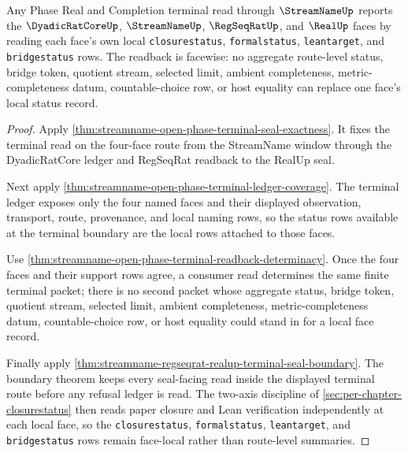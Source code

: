 \begin{theorem}
\label{thm:streamname-open-phase-terminal-face-status-readback}
Any Phase Real and Completion terminal read through $\StreamNameUp$ reports the $\DyadicRatCoreUp$, $\StreamNameUp$, $\RegSeqRatUp$, and $\RealUp$ faces by reading each face's own local \texttt{closurestatus}, \texttt{formalstatus}, \texttt{leantarget}, and \texttt{bridgestatus} rows. The readback is facewise: no aggregate route-level status, bridge token, quotient stream, selected limit, ambient completeness, metric-completeness datum, countable-choice row, or host equality can replace one face's local status record.
\end{theorem}
\begin{proof}
Apply \autoref{thm:streamname-open-phase-terminal-seal-exactness}. It fixes the terminal read on the four-face route from the StreamName window through the DyadicRatCore ledger and RegSeqRat readback to the RealUp seal.

Next apply \autoref{thm:streamname-open-phase-terminal-ledger-coverage}. The terminal ledger exposes only the four named faces and their displayed observation, transport, route, provenance, and local naming rows, so the status rows available at the terminal boundary are the local rows attached to those faces.

Use \autoref{thm:streamname-open-phase-terminal-readback-determinacy}. Once the four faces and their support rows agree, a consumer read determines the same finite terminal packet; there is no second packet whose aggregate status, bridge token, quotient stream, selected limit, ambient completeness, metric-completeness datum, countable-choice row, or host equality could stand in for a local face record.

Finally apply \autoref{thm:streamname-regseqrat-realup-terminal-seal-boundary}. The boundary theorem keeps every seal-facing read inside the displayed terminal route before any refusal ledger is read. The two-axis discipline of \autoref{sec:per-chapter-closurestatus} then reads paper closure and Lean verification independently at each local face, so the \texttt{closurestatus}, \texttt{formalstatus}, \texttt{leantarget}, and \texttt{bridgestatus} rows remain face-local rather than route-level summaries.
\end{proof}

